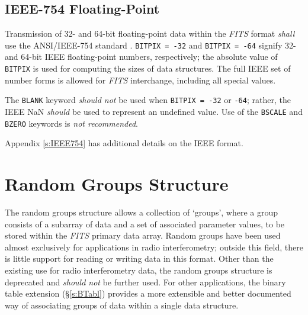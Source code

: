 \documentclass[11pt,makeidx]{book}     %
\begin{document}
  \section{IEEE-754 Floating-Point}
    Transmission of 32- and 64-bit floating-point
    data within the {\em FITS\/} 
    format {\em shall} use the ANSI/IEEE-754 standard \cite{ieee85}.
    {\tt BITPIX = -32} and 
    {\tt BITPIX = -64} signify 32- and 64-bit IEEE 
    floating-point
    numbers, respectively; the absolute value of {\tt BITPIX} 
    is
    used for computing the sizes of data structures. The full 
    IEEE set of number forms is allowed for {\em FITS\/} 
    interchange, including all special
    values.

    The {\tt BLANK} keyword
    {\em should not} be used when {\tt BITPIX = -32} or
    {\tt -64}; rather, the IEEE NaN {\em should} be used to represent an
    undefined value.  Use of the {\tt BSCALE} and {\tt BZERO}
    keywords is {\em not recommended}. 

    Appendix \ref{s:IEEE754} has additional details on the IEEE format.
   

\chapter{Random Groups Structure}
    \label{s:Rgrp}

The random groups structure allows a collection of `groups', where a
group consists of a subarray of data and a set of associated
parameter values, to be stored within the {\em FITS} primary data
array.  Random groups have been used almost
exclusively for applications in radio interferometry; outside this
field,  there is little support for reading or writing data in this
format.   Other than the existing use for radio interferometry data,
the random groups structure  is deprecated  and {\em
should not} be further used. For other applications, the binary
table  extension (\S\ref{s:BTabl}) provides a
more extensible and better documented way of associating groups of
data within a single data structure.
\end{document}
